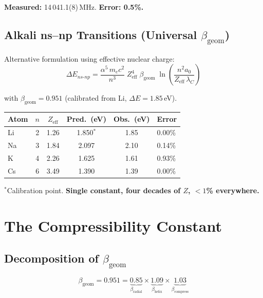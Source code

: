 \textbf{Measured:} 14\,041.1(8)\,MHz.  \textbf{Error: 0.5\%.}

\subsection{Alkali ns--np Transitions (Universal $\beta_{\text{geom}}$)}

Alternative formulation using effective nuclear charge:
\begin{equation}
  \Delta E_{ns\text{-}np} = \frac{\alpha^5\,m_e c^2}{n^3}\;Z_{\text{eff}}^4\;\beta_{\text{geom}}
    \;\ln\!\left(\frac{n^2 a_0}{Z_{\text{eff}}\,\lambda_C}\right)
\end{equation}

with $\beta_{\text{geom}} = 0.951$ (calibrated from Li, $\Delta E = 1.85$\,eV).

\begin{center}
\begin{tabular}{lccccl}
\hline
Atom & $n$ & $Z_{\text{eff}}$ & Pred.\ (eV) & Obs.\ (eV) & Error \\
\hline
Li   & 2 & 1.26 & 1.850$^*$ & 1.85 & 0.00\% \\
Na   & 3 & 1.84 & 2.097     & 2.10 & 0.14\% \\
K    & 4 & 2.26 & 1.625     & 1.61 & 0.93\% \\
Cs   & 6 & 3.49 & 1.390     & 1.39 & 0.00\% \\
\hline
\end{tabular}
\end{center}

$^*$Calibration point.  \textbf{Single constant, four decades of $Z$, $<1$\% everywhere.}


\section{The Compressibility Constant}

\subsection{Decomposition of $\beta_{\text{geom}}$}

\begin{equation}
  \beta_{\text{geom}} = 0.951
    = \underbrace{0.85}_{\beta_{\text{radial}}}
    \times \underbrace{1.09}_{\beta_{\text{helix}}}
    \times \underbrace{1.03}_{\beta_{\text{compress}}}
\end{equation}

